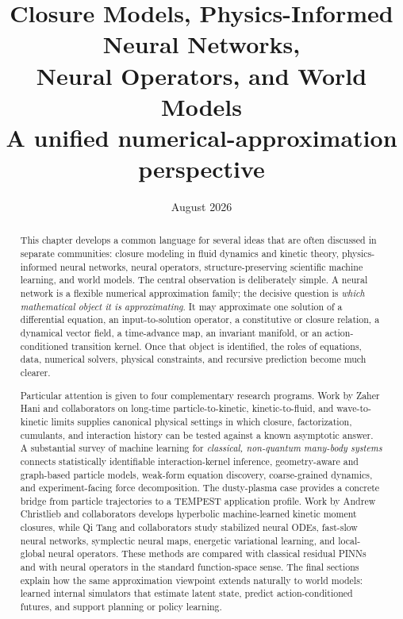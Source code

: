 \documentclass[11pt]{article}
\title{\textbf{Closure Models, Physics-Informed Neural Networks,\\Neural Operators, and World Models}\\[0.45em]
\large A unified numerical-approximation perspective}
\author{}
\date{August 2026}
\begin{document}
\maketitle

\begin{abstract}
This chapter develops a common language for several ideas that are often discussed in separate communities: closure modeling in fluid dynamics and kinetic theory, physics-informed neural networks, neural operators, structure-preserving scientific machine learning, and world models. The central observation is deliberately simple. A neural network is a flexible numerical approximation family; the decisive question is \emph{which mathematical object it is approximating}. It may approximate one solution of a differential equation, an input-to-solution operator, a constitutive or closure relation, a dynamical vector field, a time-advance map, an invariant manifold, or an action-conditioned transition kernel. Once that object is identified, the roles of equations, data, numerical solvers, physical constraints, and recursive prediction become much clearer.

Particular attention is given to four complementary research programs. Work by Zaher Hani and collaborators on long-time particle-to-kinetic, kinetic-to-fluid, and wave-to-kinetic limits supplies canonical physical settings in which closure, factorization, cumulants, and interaction history can be tested against a known asymptotic answer. A substantial survey of machine learning for \emph{classical, non-quantum many-body systems} connects statistically identifiable interaction-kernel inference, geometry-aware and graph-based particle models, weak-form equation discovery, coarse-grained dynamics, and experiment-facing force decomposition. The dusty-plasma case provides a concrete bridge from particle trajectories to a TEMPEST application profile. Work by Andrew Christlieb and collaborators develops hyperbolic machine-learned kinetic moment closures, while Qi Tang and collaborators study stabilized neural ODEs, fast-slow neural networks, symplectic neural maps, energetic variational learning, and local-global neural operators. These methods are compared with classical residual PINNs and with neural operators in the standard function-space sense. The final sections explain how the same approximation viewpoint extends naturally to world models: learned internal simulators that estimate latent state, predict action-conditioned futures, and support planning or policy learning.
\end{abstract}
\end{document}
